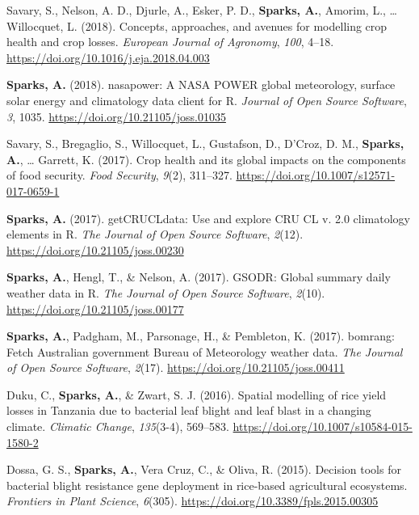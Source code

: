\documentclass[11pt, a4paper]{awesome-cv}
\begin{document}
\leavevmode\hypertarget{ref-Savary2018}{}%
Savary, S., Nelson, A. D., Djurle, A., Esker, P. D.,
\textbf{Sparks, A.}, Amorim, L., \ldots{} Willocquet, L. (2018).
Concepts, approaches, and avenues for modelling crop health and crop
losses. \emph{European Journal of Agronomy}, \emph{100}, 4--18.
\url{https://doi.org/10.1016/j.eja.2018.04.003}

\leavevmode\hypertarget{ref-Sparks2018}{}%
\textbf{Sparks, A.} (2018). {nasapower}: {A NASA POWER} global
meteorology, surface solar energy and climatology data client for {R}.
\emph{Journal of Open Source Software}, \emph{3}, 1035.
\url{https://doi.org/10.21105/joss.01035}

\leavevmode\hypertarget{ref-Savary2017}{}%
Savary, S., Bregaglio, S., Willocquet, L., Gustafson, D., D'Croz, D. M.,
\textbf{Sparks, A.}, \ldots{} Garrett, K. (2017). Crop health and its
global impacts on the components of food security. \emph{Food Security},
\emph{9}(2), 311--327. \url{https://doi.org/10.1007/s12571-017-0659-1}

\leavevmode\hypertarget{ref-Sparks2017c}{}%
\textbf{Sparks, A.} (2017). {getCRUCLdata}: {Use} and explore {CRU CL}
v. 2.0 climatology elements in {R}. \emph{The Journal of Open Source
Software}, \emph{2}(12). \url{https://doi.org/10.21105/joss.00230}

\leavevmode\hypertarget{ref-Sparks2017}{}%
\textbf{Sparks, A.}, Hengl, T., \& Nelson, A. (2017). {GSODR}: {Global}
summary daily weather data in {R}. \emph{The Journal of Open Source
Software}, \emph{2}(10). \url{https://doi.org/10.21105/joss.00177}

\leavevmode\hypertarget{ref-Sparks2017a}{}%
\textbf{Sparks, A.}, Padgham, M., Parsonage, H., \& Pembleton, K.
(2017). {bomrang}: {Fetch Australian} government {Bureau of Meteorology}
weather data. \emph{The Journal of Open Source Software}, \emph{2}(17).
\url{https://doi.org/10.21105/joss.00411}

\leavevmode\hypertarget{ref-Duku2016}{}%
Duku, C., \textbf{Sparks, A.}, \& Zwart, S. J. (2016). Spatial modelling
of rice yield losses in {Tanzania} due to bacterial leaf blight and leaf
blast in a changing climate. \emph{Climatic Change}, \emph{135}(3-4),
569--583. \url{https://doi.org/10.1007/s10584-015-1580-2}

\leavevmode\hypertarget{ref-Dossa2015}{}%
Dossa, G. S., \textbf{Sparks, A.}, Vera Cruz, C., \& Oliva, R. (2015).
Decision tools for bacterial blight resistance gene deployment in
rice-based agricultural ecosystems. \emph{Frontiers in Plant Science},
\emph{6}(305). \url{https://doi.org/10.3389/fpls.2015.00305}
\end{document}
